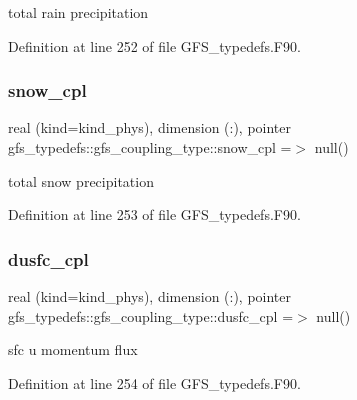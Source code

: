 total rain precipitation 



Definition at line 252 of file G\+F\+S\+\_\+typedefs.\+F90.

\mbox{\label{structgfs__typedefs_1_1gfs__coupling__type_a75433404a483fcb0fdc1a24251a994a3}} 
\subsubsection{snow\+\_\+cpl}
{\footnotesize\ttfamily real (kind=kind\+\_\+phys), dimension  (\+:), pointer gfs\+\_\+typedefs\+::gfs\+\_\+coupling\+\_\+type\+::snow\+\_\+cpl =$>$ null()}



total snow precipitation 



Definition at line 253 of file G\+F\+S\+\_\+typedefs.\+F90.

\mbox{\label{structgfs__typedefs_1_1gfs__coupling__type_aae4bb30387eeb71f61f62880479694d5}} 
\subsubsection{dusfc\+\_\+cpl}
{\footnotesize\ttfamily real (kind=kind\+\_\+phys), dimension (\+:), pointer gfs\+\_\+typedefs\+::gfs\+\_\+coupling\+\_\+type\+::dusfc\+\_\+cpl =$>$ null()}



sfc u momentum flux 



Definition at line 254 of file G\+F\+S\+\_\+typedefs.\+F90.

\mbox{\label{structgfs__typedefs_1_1gfs__coupling__type_a98cdbbeba40ffc7125bf834eb31256e0}} 
